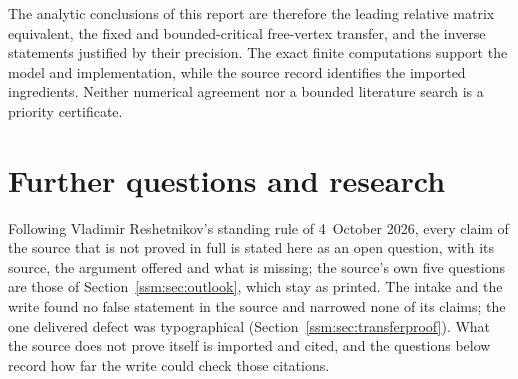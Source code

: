 The analytic conclusions of this report are therefore the leading relative matrix equivalent, the fixed and bounded-critical free-vertex transfer, and the inverse statements justified by their precision. The exact finite computations support the model and implementation, while the source record identifies the imported ingredients. Neither numerical agreement nor a bounded literature search is a priority certificate.

\section{Further questions and research}\label{ssm:sec:further}
\begin{writenote}
Following Vladimir Reshetnikov's standing rule of 4~October 2026, every
claim of the source that is not proved in full is stated here as an open
question, with its source, the argument offered and what is missing; the
source's own five questions are those of Section~\ref{ssm:sec:outlook},
which stay as printed. The intake and the write found no false statement in
the source and narrowed none of its claims; the one delivered defect was
typographical (Section~\ref{ssm:sec:transferproof}). What the source does
not prove itself is imported and cited, and the questions below record how
far the write could check those citations.
\end{writenote}
